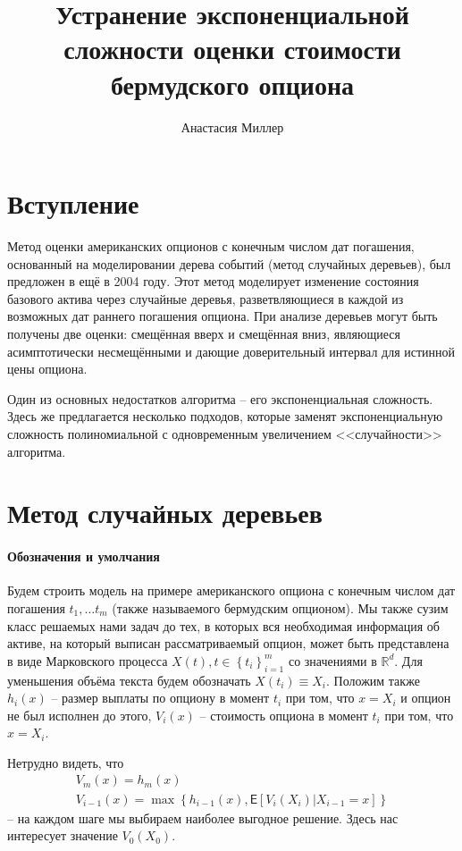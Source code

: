 \documentclass[12pt,twoside,titlepage,сa4paper]{article}
\title{Устранение экспоненциальной сложности оценки стоимости бермудского опциона}
\author{Анастасия Миллер}
\begin{document}
\maketitle
\tableofcontents
\newpage
\section{Вступление}
	\par Метод оценки американских опционов с конечным числом дат погашения, основанный на моделировании дерева событий (метод случайных деревьев), был предложен в \cite{Glasserman2004} ещё в 2004 году. Этот метод моделирует изменение состояния базового актива через случайные деревья, разветвляющиеся в каждой из возможных дат раннего погашения опциона. При анализе деревьев могут быть получены две оценки: смещённая вверх и смещённая вниз, являющиеся асимптотически несмещёнными и дающие доверительный интервал для истинной цены опциона. 
	\par Один из основных недостатков алгоритма -- его экспоненциальная сложность. Здесь же предлагается несколько подходов, которые заменят экспоненциальную сложность полиномиальной с одновременным увеличением <<случайности>> алгоритма.
\section{Метод случайных деревьев}
	\paragraph{Обозначения и умолчания}
	\par Будем строить модель на примере американского опциона с конечным числом дат погашения $t_1, \ldots t_m$ (также называемого бермудским опционом). Мы также сузим класс решаемых нами задач до тех, в которых вся необходимая информация об активе, на который выписан рассматриваемый опцион, может быть представлена в виде Марковского процесса $X\left( t \right), t \in \left\lbrace t_i \right\rbrace_{i = 1}^m$ со значениями в $\mathbb{R}^d$. Для уменьшения объёма текста будем обозначать $X\left(t_i\right) \equiv X_i$. Положим также $h_i\left(x\right)$ -- размер выплаты по опциону в момент $t_i$ при том, что $x = X_i$ и опцион не был исполнен до этого, $V_i\left(x\right)$ -- стоимость опциона в момент $t_i$ при том, что $x = X_i$.
	\par Нетрудно видеть, что
		\begin{eqnarray}\label{eq:option-recursive}
			V_m\left(x\right) = h_m\left(x\right) \\
			V_{i-1}\left(x\right) = \max\left\lbrace h_{i-1}\left(x\right), \mathsf{E}\left[V_i\left(X_i\right)|X_{i-1}=x\right]\right\rbrace
		\end{eqnarray}
	 -- на каждом шаге мы выбираем наиболее выгодное решение. Здесь нас интересует значение $V_0\left(X_0\right)$.
\end{document}
